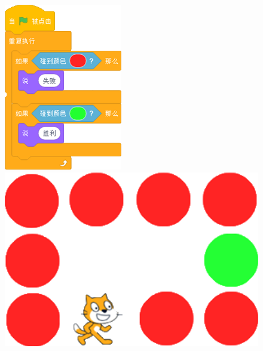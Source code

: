 \documentclass[10pt, a4paper]{article}
\begin{document}
\begin{enumerate}
\begin{figure}[htbp]
\begin{minipage}[t]{.4\textwidth}
\begin{minipage}[t]{.35\textwidth}
                    \includegraphics[width=\textwidth]{11-1.png}
                \end{minipage}
                \begin{minipage}[t]{.45\textwidth}
                    \centering
                    \includegraphics[width=1\textwidth]{11-2.png}

\end{minipage}
\end{minipage}
\end{figure}
\end{enumerate}
\end{document}
